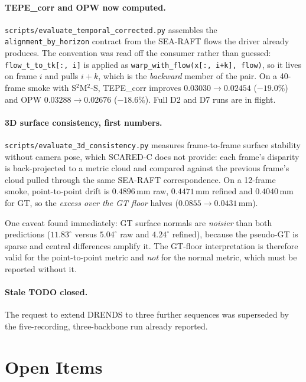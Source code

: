 \documentclass[11pt,a4paper]{article}
\begin{document}
\paragraph{TEPE\_corr and OPW now computed.}
\texttt{scripts/evaluate\_temporal\_corrected.py} assembles the
\texttt{alignment\_by\_horizon} contract from the SEA-RAFT flows the
driver already produces. The convention was read off the consumer rather
than guessed: \texttt{flow\_t\_to\_tk[:, i]} is applied as
\texttt{warp\_with\_flow(x[:, i+k], flow)}, so it lives on frame $i$ and
pulls $i+k$, which is the \emph{backward} member of the pair.
On a 40-frame smoke with S$^2$M$^2$-S, TEPE\_corr improves
$0.03030 \rightarrow 0.02454$ ($-19.0\%$) and OPW
$0.03288 \rightarrow 0.02676$ ($-18.6\%$). Full D2 and D7 runs are in
flight.

\paragraph{3D surface consistency, first numbers.}
\texttt{scripts/evaluate\_3d\_consistency.py} measures frame-to-frame
surface stability without camera pose, which SCARED-C does not provide:
each frame's disparity is back-projected to a metric cloud and compared
against the previous frame's cloud pulled through the same SEA-RAFT
correspondence. On a 12-frame smoke, point-to-point drift is
$0.4896$\,mm raw, $0.4471$\,mm refined and $0.4040$\,mm for GT, so the
\emph{excess over the GT floor} halves ($0.0855 \rightarrow 0.0431$\,mm).

One caveat found immediately: GT surface normals are \emph{noisier} than
both predictions ($11.83^\circ$ versus $5.04^\circ$ raw and
$4.24^\circ$ refined), because the pseudo-GT is sparse and central
differences amplify it. The GT-floor interpretation is therefore valid
for the point-to-point metric and \emph{not} for the normal metric,
which must be reported without it.

\paragraph{Stale TODO closed.}
The request to extend DRENDS to three further sequences was superseded
by the five-recording, three-backbone run already reported.

\section*{Open Items}
\end{document}
